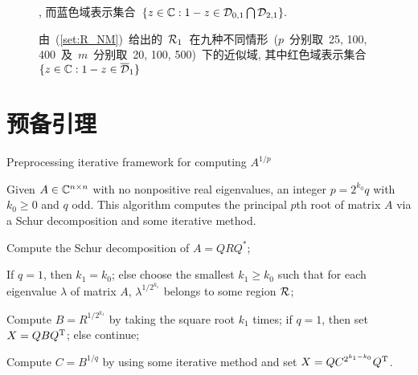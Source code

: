 \begin{figure}[h!]
\centering
{}

\caption{由~(\ref{set:R_NM})~给出的~$\mathcal {R}_1$~在九种不同情形~($p$~分别取~25,
100, 400~及~$m$~分别取~20, 100, 500)~下的近似域,
其中红色域表示集合~$\{z\in\mathbb{C}: 1-z \in \overline{\mathcal {D}}_1\}$},
而蓝色域表示集合~$\{z\in \mathbb{C}: 1-z \in \mathcal {D}_{0,1}
\bigcap\mathcal {D}_{2,1}\}.$\label{fig:NM_ConvReg}
\end{figure}




\section{预备引理}










\begin{algorithm}
\caption{Preprocessing iterative
framework for computing $A^{1/p}$} \label{al:SIM} Given $A \in
\mathbb{C}^{n \times n}$ with no nonpositive real eigenvalues, an integer
$p = 2^{k_0}q$ with $k_0 \geq 0$ and $q$ odd. This algorithm
computes the principal $p$th root of matrix $A$ via a Schur
decomposition and some iterative method.
\begin{list}{.}{
\setlength{\rightmargin}{0em}\setlength{\leftmargin}{1.2em}}
\item
Compute the Schur decomposition of $A = QRQ^*$;
\item
If $q = 1$, then $k_1 = k_0$; else choose the smallest $k_1 \geq
k_0$ such that for each eigenvalue $\lambda$ of matrix $A$,
$\lambda^{1/2^{k_1}}$ belongs to some region $\mathcal {R}$;
\item
Compute $B = R^{1/2^{k_1}}$ by taking the square root $k_1$ times;
if $q = 1$, then set $X = QB{Q}^\mathrm{T}$; else continue;
\item
Compute $C = B^{1/q}$ by using some iterative method and set $X = Q
C^{2^{k_1 - k_0}} {Q}^\mathrm{T}$.
\end{list}
\end{algorithm}



\begin{figure}[h!]
\centering
{}

\end{figure}





